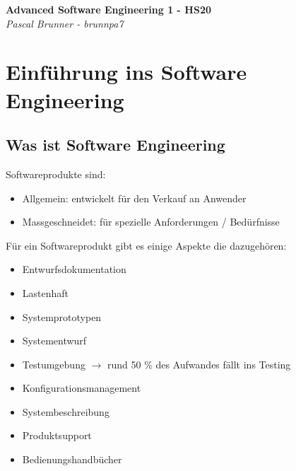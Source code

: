\documentclass{report}
\newenvironment{Figure}
	{\par\medskip\noindent\minipage{\linewidth}}
	{\endminipage\par\medskip}
\theoremstyle{definition}
\theoremstyle{example}
\begin{document}
\begin{titlepage}
   \begin{center}
      \Large\textbf{Advanced Software Engineering 1 - HS20}\\
      \large\textit{Pascal Brunner - brunnpa7}
   \end{center}
\end{titlepage}


\tableofcontents

\newpage

\chapter{Einführung ins Software Engineering}

\section{Was ist Software Engineering}
Softwareprodukte sind:
\begin{itemize}
   \item Allgemein: entwickelt für den Verkauf an Anwender
   \item Massgeschneidet: für spezielle Anforderungen / Bedürfnisse
\end{itemize}
Für ein Softwareprodukt gibt es einige Aspekte die dazugehören:
\begin{itemize}
   \item Entwurfsdokumentation
   \item Lastenhaft
   \item Systemprototypen
   \item Systementwurf
   \item Testumgebung $\rightarrow$ rund 50 \% des Aufwandes fällt ins Testing
   \item Konfigurationsmanagement
   \item Systembeschreibung
   \item Produktsupport
   \item Bedienungshandbücher
\end{itemize}
\end{document}

